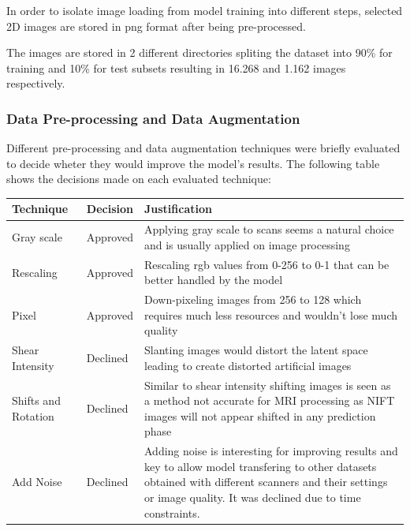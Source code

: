 In order to isolate image loading from model training into different steps, selected 2D images are stored in \acrshort{png} format after being pre-processed. 

The images are stored in 2 different directories spliting the dataset into 90\% for training and 10\% for test subsets resulting in 16.268 and 1.162 images respectively.

\subsubsection*{Data Pre-processing and Data Augmentation}

Different pre-processing and data augmentation techniques were briefly evaluated to decide wheter they would improve the model's results. The following table shows the decisions made on each evaluated technique:

\begin{table}
    \centering
    \begin{tabular}{p{3cm}|p{2cm}|p{6cm}}
        \hline
        Technique & Decision & Justification \\
        \hline
        Gray scale & Approved & Applying gray scale to scans seems a natural choice and is usually applied on image processing \\
        Rescaling & Approved & Rescaling \acrshort{rgb} values from 0-256 to 0-1 that can be better handled by the model  \\
        Pixel & Approved & Down-pixeling images from 256 to 128 which requires much less resources and wouldn't lose much quality \\
        Shear Intensity & Declined & Slanting images would distort the latent space leading to create distorted artificial images \\
        Shifts and Rotation & Declined & Similar to shear intensity shifting
            images is seen as a method not accurate for MRI processing as NIFT 
            images will not appear shifted in any prediction phase \\
        Add Noise & Declined & Adding noise is interesting for improving results and key to allow model transfering to other datasets obtained with different scanners and their settings or image quality. It was declined due to time constraints. \\
        \hline
    \end{tabular}
\end{table}




